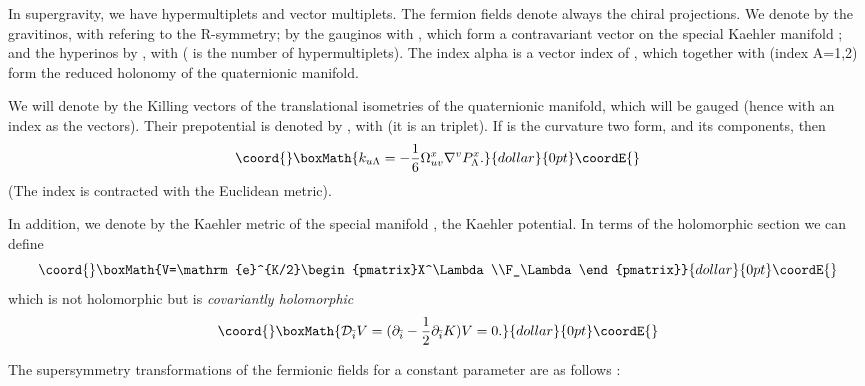 \documentclass[a4paper,12pt]{article}
\begin{document}
In \coordHE{} supergravity, we have hypermultiplets and vector
multiplets. The fermion fields denote always the chiral
projections. We denote by \coordHE{} the gravitinos, with
\coordHE{} refering to the \coordHE{} R-symmetry; by \coordHE{}
the gauginos with \coordHE{}, which form a contravariant
vector on the special Kaehler manifold \coordHE{}; and the
hyperinos by \myHighlight{$\zeta_\alpha$}\coordHE{}, with \coordHE{} (\coordHE{}
is the number of hypermultiplets). The index alpha is a vector
index
 of \coordHE{}, which together with \coordHE{} (index A=1,2)
form the reduced holonomy of the quaternionic manifold.


 We will denote   by \coordHE{}  the  Killing
vectors of the translational isometries of  the
 quaternionic manifold, which will be gauged (hence with an index \coordHE{} as the vectors).
  Their  prepotential  is denoted by  \coordHE{}, with \coordHE{} (it  is an \coordHE{} triplet).
  If \coordHE{} is the
curvature two form, and \coordHE{} its \coordHE{} components,
then
$$\coord{}\boxMath{k_{u\Lambda}=-\frac{1}6\Omega^x_{uv}\nabla^vP_\Lambda^x.}{dollar}{0pt}\coordE{}$$
(The index \coordHE{} is contracted with the Euclidean metric).

\medskip
In addition, we denote by \coordHE{} the Kaehler metric of the
special manifold \coordHE{}, \coordHE{} the Kaehler potential. In terms
of the holomorphic section \myHighlight{$\Omega$}\coordHE{} we can define
$$\coord{}\boxMath{V=\mathrm{e}^{K/2}\begin{pmatrix}X^\Lambda\\F_\Lambda\end{pmatrix}}{dollar}{0pt}\coordE{}$$
which is not holomorphic but is {\it covariantly holomorphic}
$$\coord{}\boxMath{\mathcal{D}_{\bar i}V=(\partial_{\bar i} -\frac 1
2\partial_{\bar i}K)V=0.}{dollar}{0pt}\coordE{}$$


The  supersymmetry transformations of the fermionic fields for a
constant parameter \myHighlight{$\epsilon$}\coordHE{}  are as follows \cite{abcdffm}:
\end{document}
